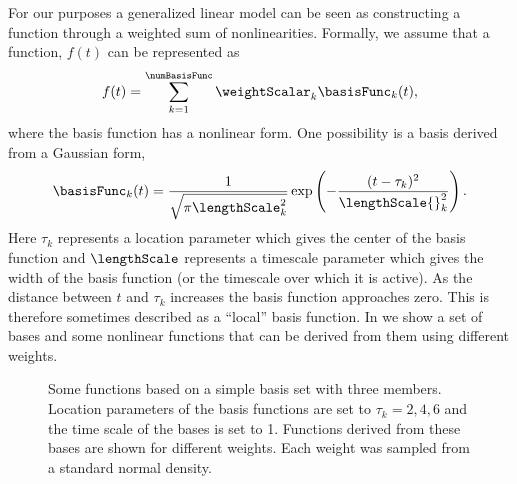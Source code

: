 \documentclass{article}
\begin{document}
For our purposes a generalized linear model can be seen as
constructing a function through a weighted sum of
nonlinearities. Formally, we assume that a function, $f(t)$ can be
represented as
\[
f(t) = \sum_{k=1}^\numBasisFunc \weightScalar_k\basisFunc_k(t),
\]
where the basis function has a nonlinear form. One possibility is a basis derived from a Gaussian form,
\begin{equation}
\basisFunc_k(t) = \frac{1}{\sqrt{\pi\lengthScale_k^2}}\exp\left(-\frac{(t-\tau_k)^2}{\lengthScale{}_k^2}\right). \label{eq:eqBasis}
\end{equation}
Here $\tau_k$ represents a location parameter which gives the center
of the basis function and $\lengthScale$ represents a timescale
parameter which gives the width of the basis function (or the
timescale over which it is active). As the distance between $t$ and
$\tau_k$ increases the basis function approaches zero. This is
therefore sometimes described as a ``local'' basis function. In
 we show a set of bases and some nonlinear
functions that can be derived from them using different weights.
\begin{figure}
  \begin{center}
  \end{center}

  \caption{Some functions based on a simple basis set with three
    members. Location parameters of the basis functions are set to
    $\tau_k = 2, 4, 6$ and the time scale of the bases is set to
    1. Functions derived from these bases are shown for different
    weights. Each weight was sampled from a standard normal
    density.}\label{fig:basisFunctions}
\end{figure}
\end{document}
